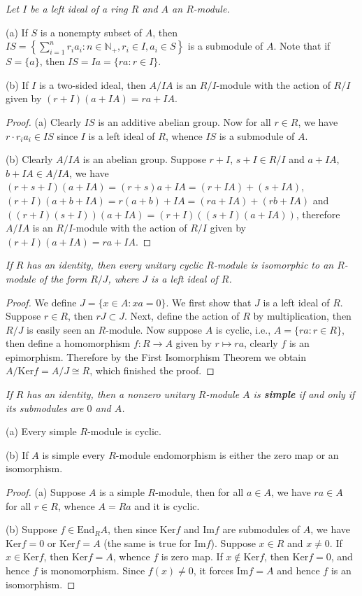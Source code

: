 \begin{problem}\em
Let $I$ be a left ideal of a ring $R$ and $A$ an $R$-module.\par
(a) If $S$ is a nonempty subset of $A$, then $IS=\left\{\sum_{i=1}^nr_ia_i:n\in\mathbb{N}_+,r_i\in I,a_i\in S\right\}$ is a submodule of $A$. Note that if $S=\{a\}$, then $IS=Ia=\{ra:r\in I\}$.\par
(b) If $I$ is a two-sided ideal, then $A/IA$ is an $R/I$-module with the action of $R/I$ given by $(r+I)(a+IA)=ra+IA$.
\end{problem}
\begin{proof}
(a) Clearly $IS$ is an additive abelian group. Now for all $r\in R$, we have $r\cdot r_ia_i\in IS$ since $I$ is a left ideal of $R$, whence $IS$ is a submodule of $A$.\par
(b) Clearly $A/IA$ is an abelian group. Suppose $r+I$, $s+I\in R/I$ and $a+IA$, $b+IA\in A/IA$, we have $(r+s+I)(a+IA)=(r+s)a+IA=(r+IA)+(s+IA)$, $(r+I)(a+b+IA)=r(a+b)+IA=(ra+IA)+(rb+IA)$ and $((r+I)(s+I))(a+IA)=(r+I)((s+I)(a+IA))$, therefore $A/IA$ is an $R/I$-module with the action of $R/I$ given by $(r+I)(a+IA)=ra+IA$.
\end{proof}
\begin{problem}\em
If $R$ has an identity, then every unitary cyclic $R$-module is isomorphic to an $R$-module of the form $R/J$, where $J$ is a left ideal of $R$.
\end{problem}
\begin{proof}
We define $J=\{x\in A:xa=0\}$. We first show that $J$ is a left ideal of $R$. Suppose $r\in R$, then $rJ\subset J$. Next, define the action of $R$ by multiplication, then $R/J$ is easily seen an $R$-module. Now suppose $A$ is cyclic, i.e., $A=\{ra:r\in R\}$, then define a homomorphism $f:R\to A$ given by $r\mapsto ra$, clearly $f$ is an epimorphism. Therefore by the First Isomorphism Theorem we obtain $A/\mathrm{Ker}f=A/J\cong R$, which finished the proof.
\end{proof}
\begin{problem}\em
If $R$ has an identity, then a nonzero unitary $R$-module $A$ is \textbf{simple} if and only if its submodules are $0$ and $A$.\par
(a) Every simple $R$-module is cyclic.\par
(b) If $A$ is simple every $R$-module endomorphism is either the zero map or an isomorphism.
\end{problem}
\begin{proof}
(a) Suppose $A$ is a simple $R$-module, then for all $a\in A$, we have $ra\in A$ for all $r\in R$, whence $A=Ra$ and it is cyclic.\par
(b) Suppose $f\in\mathrm{End}_RA$, then since $\mathrm{Ker}f$ and $\mathrm{Im}f$ are submodules of $A$, we have $\mathrm{Ker}f=0$ or $\mathrm{Ker}f=A$ (the same is true for $\mathrm{Im}f$). Suppose $x\in R$ and $x\ne 0$. If $x\in\mathrm{Ker}f$, then $\mathrm{Ker}f=A$, whence $f$ is zero map. If $x\notin\mathrm{Ker}f$, then $\mathrm{Ker}f=0$, and hence $f$ is monomorphism. Since $f(x)\ne 0$, it forces $\mathrm{Im}f=A$ and hence $f$ is an isomorphism.
\end{proof}
